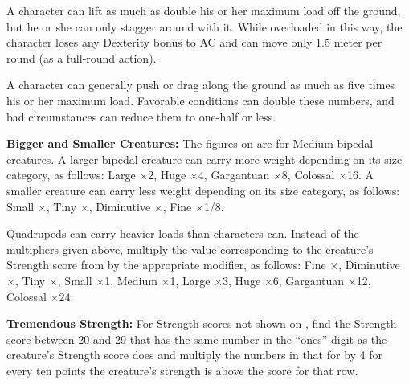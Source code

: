 A character can lift as much as double his or her maximum load off the ground, but he or she can only stagger around with it. While overloaded in this way, the character loses any Dexterity bonus to AC and can move only 1.5 meter per round (as a full-round action).

A character can generally push or drag along the ground as much as five times his or her maximum load. Favorable conditions can double these numbers, and bad circumstances can reduce them to one-half or less.

\textbf{Bigger and Smaller Creatures:} The figures on  are for Medium bipedal creatures. A larger bipedal creature can carry more weight depending on its size category, as follows: Large $\times$2, Huge $\times$4, Gargantuan $\times$8, Colossal $\times$16. A smaller creature can carry less weight depending on its size category, as follows: Small $\times$\threequarters, Tiny $\times$\onehalf, Diminutive $\times$\onequarter, Fine $\times$1/8.

Quadrupeds can carry heavier loads than characters can. Instead of the multipliers given above, multiply the value corresponding to the creature's Strength score from  by the appropriate modifier, as follows: Fine $\times$\onequarter, Diminutive $\times$\onehalf, Tiny $\times$\threequarters, Small $\times$1, Medium $\times$1\onehalf, Large $\times$3, Huge $\times$6, Gargantuan $\times$12, Colossal $\times$24.

\textbf{Tremendous Strength:} For Strength scores not shown on , find the Strength score between 20 and 29 that has the same number in the ``ones'' digit as the creature's Strength score does and multiply the numbers in that for by 4 for every ten points the creature's strength is above the score for that row.